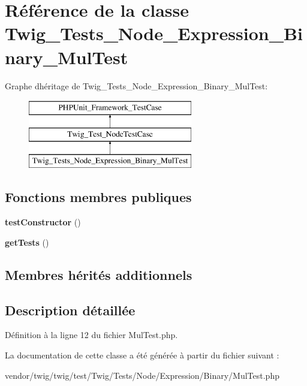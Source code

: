 \hypertarget{class_twig___tests___node___expression___binary___mul_test}{}\section{Référence de la classe Twig\+\_\+\+Tests\+\_\+\+Node\+\_\+\+Expression\+\_\+\+Binary\+\_\+\+Mul\+Test}
\label{class_twig___tests___node___expression___binary___mul_test}
Graphe d\textquotesingle{}héritage de Twig\+\_\+\+Tests\+\_\+\+Node\+\_\+\+Expression\+\_\+\+Binary\+\_\+\+Mul\+Test\+:\begin{figure}[H]
\begin{center}
\leavevmode
\includegraphics[height=3.000000cm]{class_twig___tests___node___expression___binary___mul_test}
\end{center}
\end{figure}
\subsection*{Fonctions membres publiques}
\begin{DoxyCompactItemize}
\item 
{\bfseries test\+Constructor} ()\hypertarget{class_twig___tests___node___expression___binary___mul_test_a47094dc941e72950570900d1418f89c6}{}\label{class_twig___tests___node___expression___binary___mul_test_a47094dc941e72950570900d1418f89c6}

\item 
{\bfseries get\+Tests} ()\hypertarget{class_twig___tests___node___expression___binary___mul_test_a7e247dd31cc8d37a6c97353a062a0080}{}\label{class_twig___tests___node___expression___binary___mul_test_a7e247dd31cc8d37a6c97353a062a0080}

\end{DoxyCompactItemize}
\subsection*{Membres hérités additionnels}


\subsection{Description détaillée}


Définition à la ligne 12 du fichier Mul\+Test.\+php.



La documentation de cette classe a été générée à partir du fichier suivant \+:\begin{DoxyCompactItemize}
\item 
vendor/twig/twig/test/\+Twig/\+Tests/\+Node/\+Expression/\+Binary/Mul\+Test.\+php\end{DoxyCompactItemize}
